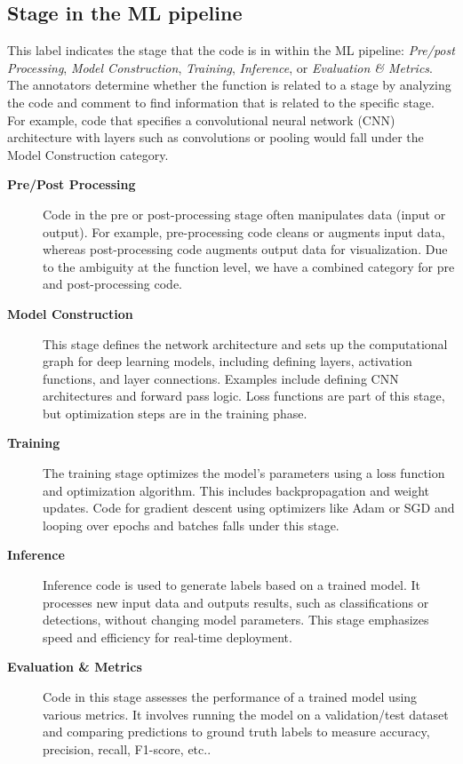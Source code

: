 \subsection{Stage in the ML pipeline}

    This label indicates the stage that the code is in within the ML pipeline: \textit{Pre/post Processing}, \textit{Model Construction}, \textit{Training}, \textit{Inference}, or \textit{Evaluation \& Metrics}.
    The annotators determine whether the function is related to a stage by analyzing the code and comment to find information that is related to the specific stage. For example, code that specifies a convolutional neural network (CNN) architecture with layers such as convolutions or pooling would fall under the Model Construction category. %

\begin{description}
    \item[\textbf{Pre/Post Processing}] Code in the pre or post-processing stage often manipulates data (input or output). For example, pre-processing code cleans or augments input data, whereas post-processing code augments output data for visualization. Due to the ambiguity at the function level, we have a combined category for pre and post-processing code\cite{wen2020time}.

    \item[\textbf{Model Construction}]This stage defines the network architecture and sets up the computational graph for deep learning models, including defining layers, activation functions, and layer connections. Examples include defining CNN architectures and forward pass logic. Loss functions are part of this stage, but optimization steps are in the training phase\cite{howard2019searching}.

    \item[\textbf{Training}]The training stage optimizes the model's parameters using a loss function and optimization algorithm. This includes backpropagation and weight updates. Code for gradient descent using optimizers like Adam or SGD and looping over epochs and batches falls under this stage\cite{diederik2014adam}.

    \item[\textbf{Inference}]Inference code is used to generate labels based on a trained model. It processes new input data and outputs results, such as classifications or detections, without changing model parameters. This stage emphasizes speed and efficiency for real-time deployment\cite{kirillov2019panoptic}.

    \item[\textbf{Evaluation \& Metrics}]Code in this stage assesses the performance of a trained model using various metrics. It involves running the model on a validation/test dataset and comparing predictions to ground truth labels to measure accuracy, precision, recall, F1-score, etc.\cite{wu2020comprehensive}.

\end{description}

